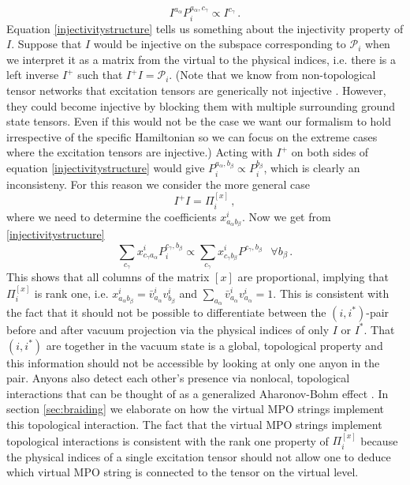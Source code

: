 \documentclass[12 pt]{article}
\begin{document}
\begin{equation} \label{injectivitystructure}
I^{a_\alpha} P_i^{a_\alpha,c_\gamma} \propto I^{c_\gamma}\, .
\end{equation}
Equation \eqref{injectivitystructure} tells us something about the injectivity property of $I$. Suppose that $I$ would be injective on the subspace corresponding to $\mathcal{P}_i$ when we interpret it as a matrix from the virtual to the physical indices, i.e. there is a left inverse $I^+$ such that $I^+I = \mathcal{P}_i$. (Note that we know from non-topological tensor networks that excitation tensors are generically not injective \cite{Haegeman,Vanderstraeten}. However, they could become injective by blocking them with multiple surrounding ground state tensors. Even if this would not be the case we want our formalism to hold irrespective of the specific Hamiltonian so we can focus on the extreme cases where the excitation tensors are injective.) Acting with $I^+$ on both sides of equation \eqref{injectivitystructure} would give $P_i^{a_\alpha,b_\beta} \propto P_i^{b_\beta}$, which is clearly an inconsisteny. For this reason we consider the more general case
\begin{equation}
I^+I = \Pi^{[x]}_i\, ,
\end{equation}
where we need to determine the coefficients $x^i_{a_\alpha b_\beta}$. Now we get from \eqref{injectivitystructure}
\begin{equation}
\sum_{c_\gamma} x^i_{c_\gamma a_\alpha} P_i^{c_\gamma ,b_\beta} \propto \sum_{c_\gamma} x^i_{c_\gamma b_\beta} P^{c_\gamma ,b_\beta}\,\;\;\forall b_\beta\, .
\end{equation}
This shows that all columns of the matrix $[x]$ are proportional, implying that $\Pi_i^{[x]}$ is rank one, i.e. $x^i_{a_\alpha b_\beta} = \bar{v}^i_{a_\alpha} v^i_{b_\beta}$ and $\sum_{a_\alpha} \bar{v}^i_{a_\alpha}v^i_{a_\alpha} = 1$. This is consistent with the fact that it should not be possible to differentiate between the $(i,i^*)$-pair before and after vacuum projection via the physical indices of only $I$ or $I^*$. That $(i,i^*)$ are together in the vacuum state is a global, topological property and this information should not be accessible by looking at only one anyon in the pair.  Anyons also detect each other's presence via nonlocal, topological interactions that can be thought of as a generalized Aharonov-Bohm effect \cite{AharonovBohm}. In section \ref{sec:braiding} we elaborate on how the virtual MPO strings implement this topological interaction. The fact that the virtual MPO strings implement topological interactions is consistent with the rank one property of $\Pi_i^{[x]}$ because the physical indices of a single excitation tensor should not allow one to deduce which virtual MPO string is connected to the tensor on the virtual level.
\end{document}
